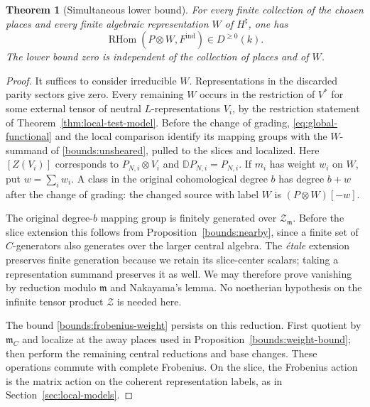 \documentclass[11pt]{article}
\numberwithin{equation}{section}
\newtheorem{theorem}{Theorem}[section]
\theoremstyle{definition}
\theoremstyle{remark}
\newcommand{\RHom}{\operatorname{RHom}}
\begin{document}
\begin{theorem}[Simultaneous lower bound]
\label{thm:simultaneous-bound}
For every finite collection of the chosen places and every finite
algebraic representation $W$ of $H^\natural$, one has
\begin{equation}
 \RHom(P\otimes W,F^{\mathrm{ind}})\in D^{\geq0}(k).
 \label{eq:lower-bound}
\end{equation}
The lower bound zero is independent of the collection of places and
of $W$.
\end{theorem}

\begin{proof}
It suffices to consider irreducible $W$.  Representations in the
discarded parity sectors give zero.  Every remaining $W$ occurs in
the restriction of $V^*$ for some external tensor of neutral
$L$-representations $V_i$, by the restriction statement of
Theorem~\ref{thm:local-test-model}.  Before the change of grading,
\eqref{eq:global-functional} and the local comparison identify its
mapping groups with the $W$-summand of
\eqref{bounds:unsheared}, pulled to the slices and localized.  Here
$[Z(V_i)]$ corresponds to $P_{N,i}\otimes V_i$ and
$\mathbb D P_{N,i}=P_{N,i}$.  If $m_i$ has weight $w_i$ on $W$, put
$w=\sum_iw_i$.  A class in the original cohomological degree $b$
has degree $b+w$ after the change of grading: the changed source
with label $W$ is $(P\otimes W)[-w]$.

The original degree-$b$ mapping group is finitely generated over
$\mathcal Z_{\mathfrak m}$.  Before the slice extension this follows
from Proposition~\ref{bounds:nearby}, since a finite set of
$C$-generators also generates over the larger central algebra.
The \emph{\'etale} extension preserves finite generation because we
retain its slice-center scalars; taking a representation summand
preserves it as well.  We may therefore prove vanishing by reduction
modulo $\mathfrak m$ and Nakayama's lemma.  No noetherian hypothesis
on the infinite tensor product $\mathcal Z$ is needed here.

The bound \eqref{bounds:frobenius-weight} persists on this reduction.
First quotient by $\mathfrak m_C$ and localize at the away places
used in Proposition~\ref{bounds:weight-bound}; then perform the
remaining central reductions and base changes.  These operations
commute with complete Frobenius.  On the slice, the Frobenius action
is the matrix action on the coherent representation labels, as in
Section~\ref{sec:local-models}.


\end{proof}
\end{document}
